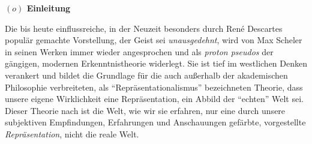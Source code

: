 \documentclass[a4paper, 12pt]{article}
\begin{document}
\begin{onehalfspace} 

\noindent\textbf{$(o)$ Einleitung}

\noindent Die bis heute einflussreiche, in der Neuzeit besonders durch Ren\'e Descartes populär gemachte Vorstellung, der Geist sei \emph{unausgedehnt}, wird von Max Scheler in seinen Werken immer wieder angesprochen und als \emph{proton pseudos} der gängigen, modernen Erkenntnistheorie widerlegt. Sie ist tief im westlichen Denken verankert und bildet die Grundlage für die auch außerhalb der akademischen Philosophie verbreiteten, als "`Repräsentationalismus"' bezeichneten Theorie, dass unsere eigene Wirklichkeit eine Reprä\-sen\-tation, ein Abbild der "`echten"' Welt sei. Dieser Theorie nach ist die Welt, wie wir sie erfahren, nur eine durch unsere subjektiven Empfindungen, Erfahrungen und Anschauungen gefärbte, vorgestellte \emph{Repräsentation}, nicht die reale Welt.




\end{onehalfspace}
\end{document}
